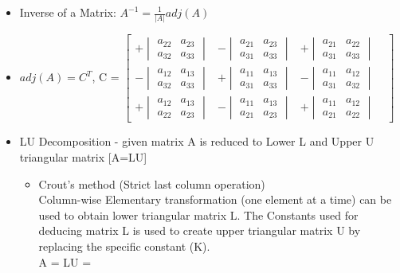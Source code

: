\begin{itemize}
    \item Inverse of a Matrix: \(A^{-1}=\frac{1}{|A|}adj(A)\)
    \item \(adj(A) = C^T\), C = 
    $\begin{bmatrix}
        +\begin{vmatrix} a_{22} & a_{23}\\ a_{32} & a_{33} \end{vmatrix} &
        -\begin{vmatrix} a_{21} & a_{23}\\ a_{31} & a_{33} \end{vmatrix} &
        +\begin{vmatrix} a_{21} & a_{22}\\ a_{31} & a_{33} \end{vmatrix} & \\
        -\begin{vmatrix} a_{12} & a_{13}\\ a_{32} & a_{33} \end{vmatrix} &
        +\begin{vmatrix} a_{11} & a_{13}\\ a_{31} & a_{33} \end{vmatrix} &
        -\begin{vmatrix} a_{11} & a_{12}\\ a_{31} & a_{32} \end{vmatrix} & \\
        +\begin{vmatrix} a_{12} & a_{13}\\ a_{22} & a_{23} \end{vmatrix} &
        -\begin{vmatrix} a_{11} & a_{13}\\ a_{21} & a_{23} \end{vmatrix} &
        +\begin{vmatrix} a_{11} & a_{12}\\ a_{21} & a_{22} \end{vmatrix} &
    \end{bmatrix}$
    \item LU Decomposition - given matrix A is reduced to Lower L and Upper U triangular matrix 
    [A=LU]
        \begin{itemize}
            \item Crout's method (Strict last column operation)\\
            Column-wise Elementary transformation (one element at a time) can be used to obtain lower triangular matrix L. The Constants used for deducing matrix L is used to create upper triangular matrix U by replacing the specific constant (K). \\ A = LU = 

\end{itemize}
\end{itemize}
